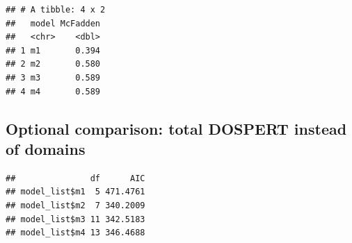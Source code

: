 \documentclass[
]{article}
\newenvironment{Shaded}{\begin{snugshade}}{\end{snugshade}}
\newcommand{\AttributeTok}[1]{\textcolor[rgb]{0.13,0.29,0.53}{#1}}
\newcommand{\FunctionTok}[1]{\textcolor[rgb]{0.13,0.29,0.53}{\textbf{#1}}}
\newcommand{\NormalTok}[1]{#1}
\newcommand{\OtherTok}[1]{\textcolor[rgb]{0.56,0.35,0.01}{#1}}
\newcommand{\SpecialCharTok}[1]{\textcolor[rgb]{0.81,0.36,0.00}{\textbf{#1}}}
\newcommand{\StringTok}[1]{\textcolor[rgb]{0.31,0.60,0.02}{#1}}
\begin{document}
\begin{Shaded}
\end{Shaded}

\begin{verbatim}
## # A tibble: 4 x 2
##   model McFadden
##   <chr>    <dbl>
## 1 m1       0.394
## 2 m2       0.580
## 3 m3       0.589
## 4 m4       0.589
\end{verbatim}

\subsection{Optional comparison: total DOSPERT instead of
domains}\label{optional-comparison-total-dospert-instead-of-domains}

\begin{Shaded}
\end{Shaded}

\begin{verbatim}
##               df      AIC
## model_list$m1  5 471.4761
## model_list$m2  7 340.2009
## model_list$m3 11 342.5183
## model_list$m4 13 346.4688
\end{verbatim}

\begin{Shaded}
\end{Shaded}
\end{document}
